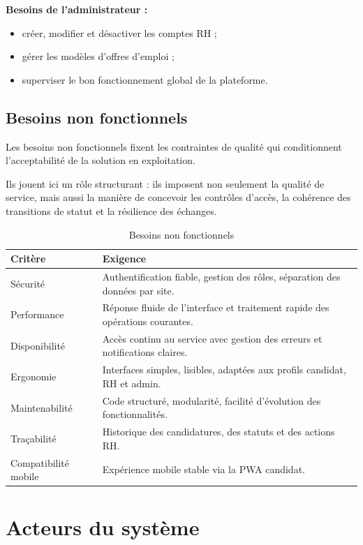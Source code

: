 \textbf{Besoins de l'administrateur :}
\begin{itemize}
    \item créer, modifier et désactiver les comptes RH ;
    \item gérer les modèles d'offres d'emploi ;
    \item superviser le bon fonctionnement global de la plateforme.
\end{itemize}

\subsection{Besoins non fonctionnels}

Les besoins non fonctionnels fixent les contraintes de qualité qui
conditionnent l'acceptabilité de la solution en exploitation.

Ils jouent ici un rôle structurant : ils imposent non seulement la qualité
de service, mais aussi la manière de concevoir les contrôles d'accès, la
cohérence des transitions de statut et la résilience des échanges.

\begin{table}[H]
\centering
\caption{Besoins non fonctionnels}
\begin{tabularx}{\textwidth}{|l|X|}
\hline
\textbf{Critère} & \textbf{Exigence} \\
\hline
Sécurité & Authentification fiable, gestion des rôles, séparation des données par site. \\
\hline
Performance & Réponse fluide de l'interface et traitement rapide des opérations courantes. \\
\hline
Disponibilité & Accès continu au service avec gestion des erreurs et notifications claires. \\
\hline
Ergonomie & Interfaces simples, lisibles, adaptées aux profils candidat, RH et admin. \\
\hline
Maintenabilité & Code structuré, modularité, facilité d'évolution des fonctionnalités. \\
\hline
Traçabilité & Historique des candidatures, des statuts et des actions RH. \\
\hline
Compatibilité mobile & Expérience mobile stable via la PWA candidat. \\
\hline
\end{tabularx}
\end{table}

\section{Acteurs du système}

